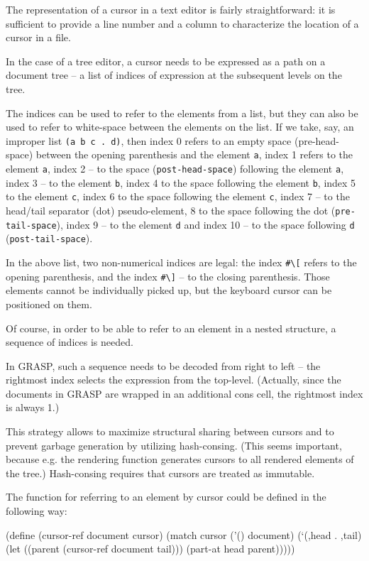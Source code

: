\documentclass[sigconf]{acmart}
\newenvironment{Snippet}{\Verbatim[samepage=true]}{\endVerbatim}
\begin{document}
The representation of a cursor in a text editor is fairly
straightforward: it is sufficient to provide a line number
and a column to characterize the location of a cursor
in a file.

In the case of a tree editor, a cursor needs to be expressed
as a path on a document tree -- a list of indices
of expression at the subsequent levels on the tree.

The indices can be used to refer to the elements
from a list, but they can also be used to refer to
white-space between the elements on the list. If we take,
say, an improper list \texttt{(a b c . d)}, then index 0
refers to an empty space (pre-head-space) between 
the opening parenthesis and the element \texttt{a}, index 1 refers 
to the element \texttt{a}, index 2 -- to the space 
(\texttt{post-head-space})
following the element \texttt{a}, index 3 -- to the element 
\texttt{b},
index 4 to the space following the element \texttt{b},
index 5 to the element \texttt{c}, index 6 to the space following
the element \texttt{c}, index 7 -- to the head/tail 
separator (dot) pseudo-element, 8 to the space following the dot
(\texttt{pre-tail-space}), index 9 -- to the element \texttt{d}
and index 10 -- to the space following \texttt{d}
(\texttt{post-tail-space}).

In the above list, two non-numerical indices are legal:
the index \texttt{\#\textbackslash[} refers to the opening parenthesis,
and the index \texttt{\#\textbackslash]} -- to the closing parenthesis. Those
elements cannot be individually picked up, but the keyboard
cursor can be positioned on them.

Of course, in order to be able to refer to an element
in a nested structure, a sequence of indices is needed.

In GRASP, such a sequence needs to be decoded from right
to left -- the rightmost index selects the expression
from the top-level. (Actually, since the documents in
GRASP are wrapped in an additional cons cell, the rightmost
index is always 1.)

This strategy allows to maximize structural sharing
between cursors and to prevent garbage generation
by utilizing hash-consing. (This seems important, because
e.g. the rendering function generates cursors to all
rendered elements of the tree.)
Hash-consing requires that cursors are treated as
immutable.

The function for referring to an element by cursor
could be defined in the following way:

\begin{Snippet}
(define (cursor-ref document cursor)
  (match cursor
    ('()
     document)
    (`(,head . ,tail)
     (let ((parent (cursor-ref document tail)))
       (part-at head parent)))))
\end{Snippet}
\end{document}
